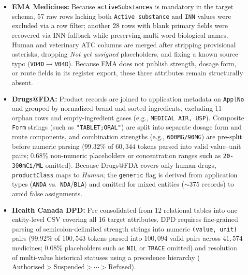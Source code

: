 \documentclass{llncs}
\begin{document}
\begin{itemize}
  \item \textbf{EMA Medicines:} Because \texttt{activeSubstances} is mandatory in the target schema, 57 raw rows lacking both \texttt{Active substance} and \texttt{INN} values were excluded via a row filter; another 28 rows with blank primary fields were recovered via INN fallback while preserving multi-word biological names. Human and veterinary ATC columns are merged after stripping provisional asterisks, dropping \textit{Not yet assigned} placeholders, and fixing a known source typo (\texttt{VO4D}$\rightarrow$\texttt{V04D}). Because EMA does not publish strength, dosage form, or route fields in its register export, these three attributes remain structurally absent.
  \item \textbf{Drugs@FDA:} Product records are joined to application metadata on \texttt{ApplNo} and grouped by normalized brand and sorted ingredients, excluding 11 orphan rows and empty-ingredient gases (e.g., \texttt{MEDICAL AIR, USP}). Composite \texttt{Form} strings (such as \texttt{"TABLET;ORAL"}) are split into separate dosage form and route components, and combination strengths (e.g., \texttt{600MG/90MG}) are pre-split before numeric parsing ($99.32\%$ of $60{,}344$ tokens parsed into valid value--unit pairs; $0.68\%$ non-numeric placeholders or concentration ranges such as \texttt{20-300mCi/ML} omitted). Because Drugs@FDA covers only human drugs, \texttt{productClass} maps to \textit{Human}; the \texttt{generic} flag is derived from application types (\texttt{ANDA} vs.\ \texttt{NDA}/\texttt{BLA}) and omitted for mixed entities ($\sim$375 records) to avoid false assignments.
  \item \textbf{Health Canada DPD:} Pre-consolidated from 12 relational tables into one entity-level CSV covering all 16 target attributes, DPD requires fine-grained parsing of semicolon-delimited strength strings into numeric \texttt{(value, unit)} pairs ($99.92\%$ of $100{,}543$ tokens parsed into $100{,}094$ valid pairs across $41{,}574$ medicines; $0.08\%$ placeholders such as \texttt{NIL} or \texttt{TRACE} omitted) and resolution of multi-value historical statuses using a precedence hierarchy ($\text{Authorised} > \text{Suspended} > \cdots > \text{Refused}$).
\end{itemize}
\end{document}
